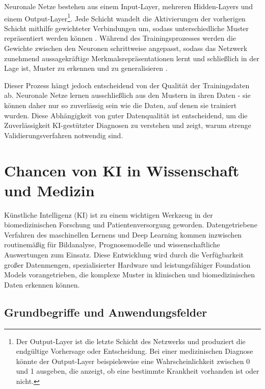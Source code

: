 \documentclass[lettersize,journal]{IEEEtran}
\begin{document}
Neuronale Netze bestehen aus einem Input-Layer, mehreren Hidden-Layers und einem Output-Layer\footnote{Der Output-Layer ist die letzte Schicht des Netzwerks und produziert die endgültige Vorhersage oder Entscheidung. Bei einer medizinischen Diagnose könnte der Output-Layer beispielsweise eine Wahrscheinlichkeit zwischen 0 und 1 ausgeben, die anzeigt, ob eine bestimmte Krankheit vorhanden ist oder nicht.}. Jede Schicht wandelt die Aktivierungen der vorherigen Schicht mithilfe gewichteter Verbindungen um, sodass unterschiedliche Muster repräsentiert werden können \cite{ref:alexander}. Während des Trainingsprozesses werden die Gewichte zwischen den Neuronen schrittweise angepasst, sodass das Netzwerk zunehmend aussagekräftige Merkmalsrepräsentationen lernt und schließlich in der Lage ist, Muster zu erkennen und zu generalisieren \cite{ref:alexander}.

Dieser Prozess hängt jedoch entscheidend von der Qualität der Trainingsdaten ab. Neuronale Netze lernen ausschließlich aus den Mustern in ihren Daten - sie können daher nur so zuverlässig sein wie die Daten, auf denen sie trainiert wurden\cite{ref:morhammed2025}. Diese Abhängigkeit von guter Datenqualität ist entscheidend, um die Zuverlässigkeit KI-gestützter Diagnosen zu verstehen und zeigt, warum strenge Validierungsverfahren notwendig sind.



\section{Chancen von KI in Wissenschaft und Medizin}
\label{sec:chancen}

Künstliche Intelligenz (KI) ist zu einem wichtigen Werkzeug in der biomedizinischen Forschung und Patientenversorgung geworden. Datengetriebene Verfahren des maschinellen Lernens und Deep Learning kommen inzwischen routinemäßig für Bildanalyse, Prognosemodelle und wissenschaftliche Auswertungen zum Einsatz\cite{ref:hai2025aiindex}. Diese Entwicklung wird durch die Verfügbarkeit großer Datenmengen, spezialisierter Hardware und leistungsfähiger Foundation Models vorangetrieben, die komplexe Muster in klinischen und biomedizinischen Daten erkennen können\cite{ref:hai2025aiindex}.

	
\subsection{Grundbegriffe und Anwendungsfelder}
\label{subsec:grundbegriffe}
\end{document}
